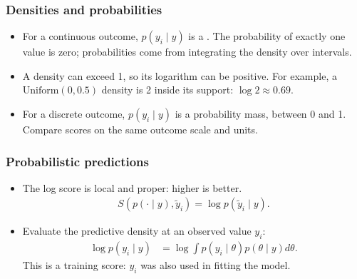\documentclass[10pt]{beamer}
\begin{document}
\begin{frame}
\frametitle{Densities and probabilities}

  \begin{itemize}
  \item For a continuous outcome, $p(y_i\mid y)$ is a .
    The probability of exactly one value is zero; probabilities come
    from integrating the density over intervals.
  \item<2-> A density can exceed 1, so its logarithm can be positive.
    For example, a $\mathrm{Uniform}(0,0.5)$ density is 2 inside its support:
    $\log 2\approx0.69$.
  \item<3-> For a discrete outcome, $p(y_i\mid y)$ is a probability mass,
    between 0 and 1. Compare scores on the same outcome scale and units.
  \end{itemize}
\end{frame}

\begin{frame}
\frametitle{Probabilistic predictions}

    \begin{itemize}
      \item The log score is local and proper: higher is better.
      \begin{align*}
         S(p(\cdot\mid y),\tilde y_i) = \log p(\tilde y_i\mid y).
      \end{align*}
      \pause
      \item Evaluate the predictive density at an observed value $y_i$:
      \begin{align*}
        \log p(y_i\mid y)
        &= \log\int p(y_i\mid\theta)p(\theta\mid y)d\theta.
      \end{align*}
      This is a training score: $y_i$ was also used in fitting the model.
  \end{itemize}

\end{frame}
\end{document}
